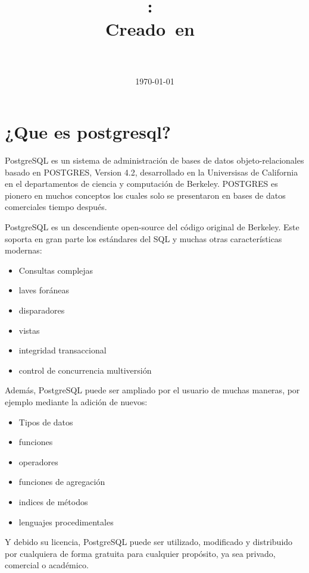 \documentclass{article}
\title{
\vspace{2in}
\textmd{\textbf{\Curso:\ \Titulo}}\\
\normalsize\vspace{0.1in}\small{Creado\ en\ \Fecha}\\
\vspace{0.1in}\large{\textit{\Autor\ \\ \Profesion}}
\vspace{3in}
}
\author{\textbf{\SIGLA}}
\date{\today} %
\begin{document}
\maketitle



\newpage
\tableofcontents
\newpage

\section{¿Que es postgresql?}
PostgreSQL es un sistema de administración de bases de datos objeto-relacionales basado en POSTGRES, Version 4.2, desarrollado en la Universisas de California en el departamentos de ciencia y computación de Berkeley. POSTGRES es pionero en muchos conceptos los cuales solo se presentaron en bases de datos comerciales tiempo después.

PostgreSQL es un descendiente open-source del código original de Berkeley. Este soporta en gran parte los estándares del SQL y muchas otras características modernas:
\begin{itemize}
\item Consultas complejas
\item laves foráneas
\item disparadores
\item vistas
\item integridad transaccional
\item control de concurrencia multiversión 
\end{itemize}
Además, PostgreSQL puede ser ampliado por el usuario de muchas maneras, por ejemplo mediante la adición de nuevos:
\begin{itemize}
\item Tipos de datos
\item funciones
\item operadores
\item funciones de agregación 
\item indices de métodos
\item lenguajes procedimentales
\end{itemize}
Y debido su licencia, PostgreSQL puede ser utilizado, modificado y distribuido por cualquiera de forma gratuita para cualquier propósito, ya sea privado, comercial o académico.
\end{document}
